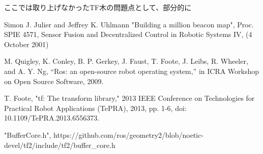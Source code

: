 \documentclass{article}
\begin{document}
\begin{multicols}{2}
ここでは取り上げなかったTF木の問題点として、部分的に

	
\begin{thebibliography}{99}

 Simon J. Julier and Jeffrey K. Uhlmann "Building a million beacon map", Proc. SPIE 4571, Sensor Fusion and Decentralized Control in Robotic Systems IV, (4 October 2001)

 M. Quigley, K. Conley, B. P. Gerkey, J. Faust, T. Foote, J. Leibs, R. Wheeler, and A. Y. Ng, “Ros: an open-source robot operating system,” in ICRA Workshop on Open Source Software, 2009.

 T. Foote, "tf: The transform library," 2013 IEEE Conference on Technologies for Practical Robot Applications (TePRA), 2013, pp. 1-6, doi: 10.1109/TePRA.2013.6556373.

 "BufferCore.h", https://github.com/ros/geometry2/blob/noetic-devel/tf2/include/tf2/buffer\_core.h

\end{thebibliography}
	
\end{multicols}	
\end{document}
